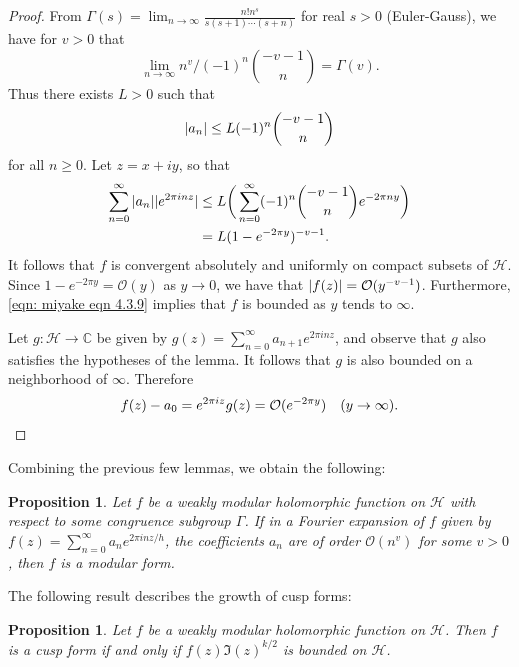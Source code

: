 \documentclass[10pt,leqno,twoside]{article}
\theoremstyle{plain}
\newtheorem{proposition}[lem]{Proposition}
\theoremstyle{definition}
\numberwithin{equation}{section}
\numberwithin{lem}{section}
\begin{document}
\begin{proof}
    From $\varGamma(s) = \lim_{n\to \infty}\frac{n!n^s}{s(s+1)\cdots(s+n)}$ for real $s>0$ (Euler-Gauss), we have for $v>0$ that
    \[\lim_{n\to\infty} n^v/(-1)^n\binom{-v-1}{n} = \varGamma(v).\]
    Thus there exists $L>0$ such that 
    \[\abs{a_n}\leq L(-1)^n\binom{-v-1}{n}\] for all $n\geq 0$. Let $z = x+iy$, so that 
    \begin{align}\label{eqn: miyake eqn 4.3.9}
        \sum_{n=0}^\infty\abs{a_n}|e^{2\pi i n z}|&\leq L\bigg(\sum_{n=0}^\infty (-1)^n\binom{-v-1}{n}e^{-2\pi n y}\bigg)\\
        &= L(1-e^{-2\pi y})^{-v-1}.\nonumber
    \end{align}
    It follows that $f$ is convergent absolutely and uniformly on compact subsets of $\mathcal H$. Since $1-e^{-2\pi y} = \mathcal O(y)$ as $y\to 0$, we have that $\abs{f(z)} = \mathcal O(y^{-v-1})$. Furthermore, \cref{eqn: miyake eqn 4.3.9} implies that $f$ is bounded as $y$ tends to $\infty$.

    Let $g\colon\mathcal H\to\mathbb C$ be given by $g(z) = \sum_{n=0}^\infty a_{n+1}e^{2\pi i nz}$, and observe that $g$ also satisfies the hypotheses of the lemma. It follows that $g$ is also bounded on a neighborhood of $\infty$. Therefore 
    \[f(z)-a_0 = e^{2\pi i z}g(z) = \mathcal O(e^{-2\pi y})\quad (y\to \infty).\qedhere\]
\end{proof}
Combining the previous few lemmas, we obtain the following:
\begin{proposition}\label{prop: growth of fourier coeffs}
    Let $f$ be a weakly modular holomorphic function on $\mathcal H$ with respect to some congruence subgroup $\varGamma$. If in a Fourier expansion of $f$ given by $f(z) = \sum_{n = 0}^\infty a_ne^{2\pi i n z/h}$, the coefficients $a_n$ are of order $\mathcal O(n^v)$ for some $v>0$, then $f$ is a modular form.
\end{proposition}
The following result describes the growth of cusp forms:
\begin{proposition}\label{prop: product cuspform boundedness}
    Let $f$ be a weakly modular holomorphic function on $\mathcal H$. Then $f$ is a cusp form if and only if $f(z)\Im(z)^{k/2}$ is bounded on $\mathcal H$.
\end{proposition}
\end{document}
